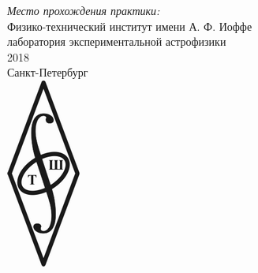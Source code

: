 \begin{titlepage}

{\large
\emph{Место прохождения практики:} \\
Физико-технический институт имени А. Ф. Иоффе\\ лаборатория экспериментальной астрофизики
}\\[3 cm]


{\large 2018 \\Санкт-Петербург}\\[0.55cm] %


\includegraphics{pictures/logo.png}\\[1cm] %
 

\vfill %

\end{titlepage}
